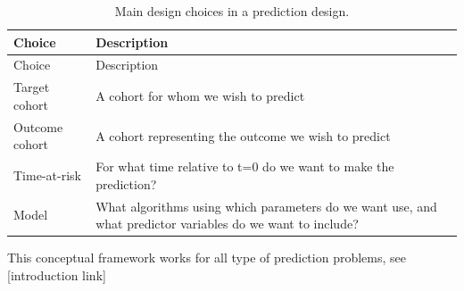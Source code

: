 \documentclass[11pt]{book}
\theoremstyle{definition}
\theoremstyle{definition}
\theoremstyle{definition}
\theoremstyle{remark}
\begin{document}
\begin{longtable}[]{@{}ll@{}}
\caption{\label{tab:plpDesign} Main design choices in a prediction design.}\tabularnewline
\toprule
\begin{minipage}[b]{0.23\columnwidth}\raggedright
Choice\strut
\end{minipage} & \begin{minipage}[b]{0.72\columnwidth}\raggedright
Description\strut
\end{minipage}\tabularnewline
\midrule
\endfirsthead
\toprule
\begin{minipage}[b]{0.23\columnwidth}\raggedright
Choice\strut
\end{minipage} & \begin{minipage}[b]{0.72\columnwidth}\raggedright
Description\strut
\end{minipage}\tabularnewline
\midrule
\endhead
\begin{minipage}[t]{0.23\columnwidth}\raggedright
Target cohort\strut
\end{minipage} & \begin{minipage}[t]{0.72\columnwidth}\raggedright
A cohort for whom we wish to predict\strut
\end{minipage}\tabularnewline
\begin{minipage}[t]{0.23\columnwidth}\raggedright
Outcome cohort\strut
\end{minipage} & \begin{minipage}[t]{0.72\columnwidth}\raggedright
A cohort representing the outcome we wish to predict\strut
\end{minipage}\tabularnewline
\begin{minipage}[t]{0.23\columnwidth}\raggedright
Time-at-risk\strut
\end{minipage} & \begin{minipage}[t]{0.72\columnwidth}\raggedright
For what time relative to t=0 do we want to make the prediction?\strut
\end{minipage}\tabularnewline
\begin{minipage}[t]{0.23\columnwidth}\raggedright
Model\strut
\end{minipage} & \begin{minipage}[t]{0.72\columnwidth}\raggedright
What algorithms using which parameters do we want use, and what predictor variables do we want to include?\strut
\end{minipage}\tabularnewline
\bottomrule
\end{longtable}

This conceptual framework works for all type of prediction problems, see {[}introduction link{]}
\end{document}
